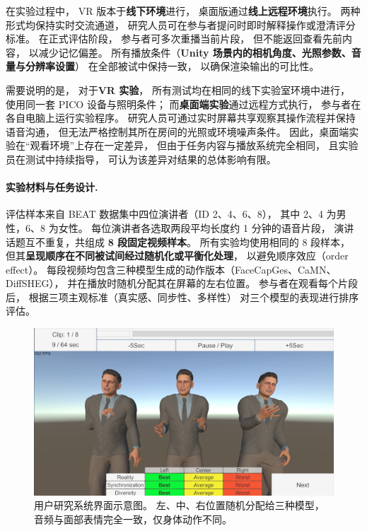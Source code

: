 \begin{table}[h]
在实验过程中，
VR 版本于\textbf{线下环境}进行，
桌面版通过\textbf{线上远程环境}执行。
两种形式均保持实时交流通道，
研究人员可在参与者提问时即时解释操作或澄清评分标准。
在正式评估阶段，
参与者可多次重播当前片段，
但不能返回查看先前内容，
以减少记忆偏差。
所有播放条件（\textbf{Unity 场景内的相机角度、光照参数、音量与分辨率设置}）
在全部被试中保持一致，
以确保渲染输出的可比性。

需要说明的是，
对于\textbf{VR 实验}，
所有测试均在相同的线下实验室环境中进行，
使用同一套 PICO 设备与照明条件；
而\textbf{桌面端实验}通过远程方式执行，
参与者在各自电脑上运行实验程序。
研究人员可通过实时屏幕共享观察其操作流程并保持语音沟通，
但无法严格控制其所在房间的光照或环境噪声条件。
因此，桌面端实验在“观看环境”上存在一定差异，
但由于任务内容与播放系统完全相同，
且实验员在测试中持续指导，
可认为该差异对结果的总体影响有限。

\paragraph{实验材料与任务设计.}
评估样本来自 BEAT 数据集中四位演讲者（ID 2、4、6、8），
其中 2、4 为男性，6、8 为女性。
每位演讲者各选取两段平均长度约 1 分钟的语音片段，
演讲话题互不重复，共组成 \textbf{8 段固定视频样本}。
所有实验均使用相同的 8 段样本，
但其\textbf{呈现顺序在不同被试间经过随机化或平衡化处理}，
以避免顺序效应（order effect）。
每段视频均包含三种模型生成的动作版本（FaceCapGes、CaMN、DiffSHEG），
并在播放时随机分配其在屏幕的左右位置。
参与者在观看每个片段后，
根据三项主观标准（真实感、同步性、多样性）
对三个模型的表现进行排序评估。

\begin{figure}[h!t]
\centering
\includegraphics[width=\linewidth]{figures/UserStudyImage.png}
\caption{用户研究系统界面示意图。
左、中、右位置随机分配给三种模型，
音频与面部表情完全一致，仅身体动作不同。}
\label{fig:userstudy_app}
\end{figure}


\end{table}
